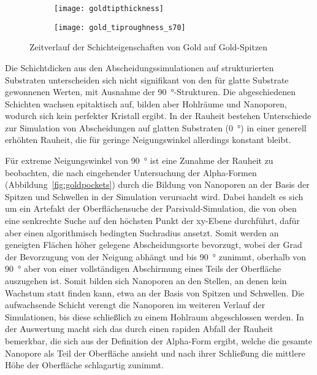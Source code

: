 \begin{figure}
  \captionsetup[subfigure]{singlelinecheck=false}
  \def\subfigwidth{0.49\textwidth}

  \begin{subfigure}[t]{\subfigwidth}
    \texttt{[image: goldtipthickness]}
    \label{fig:goldrough-a}
  \end{subfigure}
  \hfill
  \begin{subfigure}[t]{\subfigwidth}
    \texttt{[image: gold\_tiproughness\_s70]}
    \label{fig:goldrough-b}
  \end{subfigure}

  \caption[Schichteigenschaften von Gold auf Gold-Spitzen]{
    Zeitverlauf der Schichteigenschaften von Gold auf Gold-Spitzen
  }
  \label{fig:goldrough}

\end{figure}

Die Schichtdicken aus den Abscheidungssimulationen auf strukturierten Substraten unterscheiden sich nicht signifikant von den für glatte Substrate gewonnenen Werten, mit Ausnahme der \SI{90}{\degree}-Strukturen.
Die abgeschiedenen Schichten wachsen epitaktisch auf, bilden aber Hohlräume und Nanoporen, wodurch sich kein perfekter Kristall ergibt.
In der Rauheit bestehen Unterschiede zur Simulation von Abscheidungen auf glatten Substraten (\SI{0}{\degree}) in einer generell erhöhten Rauheit, die für geringe Neigungswinkel allerdings konstant bleibt.

Für extreme Neigungswinkel von \SI{90}{\degree} ist eine Zunahme der Rauheit zu beobachten, die nach eingehender Untersuchung der Alpha-Formen (Abbildung~\ref{fig:goldpockets}) durch die Bildung von Nanoporen an der Basis der Spitzen und Schwellen in der Simulation verursacht wird.
Dabei handelt es sich um ein Artefakt der Oberflächensuche der Parsivald-Simulation, die von oben eine senkrechte Suche auf den höchsten Punkt der xy-Ebene durchführt, dafür aber einen algorithmisch bedingten Suchradius ansetzt.
Somit werden an geneigten Flächen höher gelegene Abscheidungsorte bevorzugt, wobei der Grad der Bevorzugung von der Neigung abhängt und bis \SI{90}{\degree} zunimmt, oberhalb von \SI{90}{\degree} aber von einer vollständigen Abschirmung eines Teils der Oberfläche auszugehen ist.
Somit bilden sich Nanoporen an den Stellen, an denen kein Wachstum statt finden kann, etwa an der Basis von Spitzen und Schwellen.
Die aufwachsende Schicht verengt die Nanoporen im weiteren Verlauf der Simulationen, bis diese schließlich zu einem Hohlraum abgeschlossen werden.
In der Auswertung macht sich das durch einen rapiden Abfall der Rauheit bemerkbar, die sich aus der Definition der Alpha-Form ergibt, welche die gesamte Nanopore als Teil der Oberfläche ansieht und nach ihrer Schließung die mittlere Höhe der Oberfläche schlagartig zunimmt.

